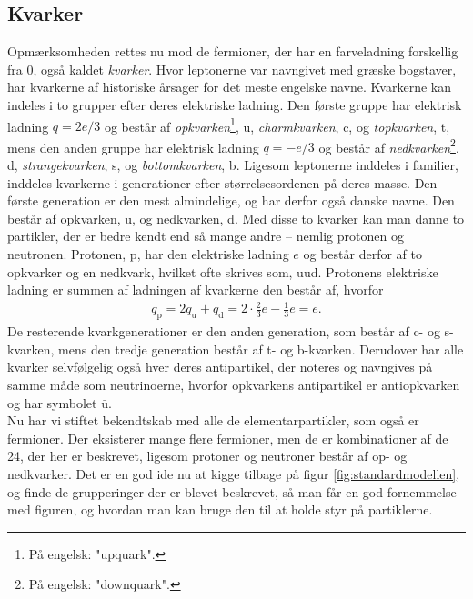 \subsection{Kvarker}
Opmærksomheden rettes nu mod de fermioner, der har en farveladning forskellig fra 0, også kaldet \emph{kvarker}. Hvor leptonerne var navngivet med græske bogstaver, har kvarkerne af historiske årsager for det meste engelske navne. Kvarkerne kan indeles i to grupper efter deres elektriske ladning. Den første gruppe har elektrisk ladning $q=2e/3$ og består af \emph{opkvarken}\footnote{På engelsk: "upquark".}, u, \emph{charmkvarken}, c, og \emph{topkvarken}, t, mens den anden gruppe har elektrisk ladning $q = -e/3$ og består af \emph{nedkvarken}\footnote{På engelsk: "downquark".}, d, \emph{strangekvarken}, s, og \emph{bottomkvarken}, b. Ligesom leptonerne inddeles i familier, inddeles kvarkerne i generationer efter størrelsesordenen på deres masse. Den første generation er den mest almindelige, og har derfor også danske navne. Den består af opkvarken, u, og nedkvarken, d. Med disse to kvarker kan man danne to partikler, der er bedre kendt end så mange andre -- nemlig protonen og neutronen. Protonen, p, har den elektriske ladning $e$ og består derfor af to opkvarker og en nedkvark, hvilket ofte skrives som, uud. Protonens elektriske ladning er summen af ladningen af kvarkerne den består af, hvorfor
%
\begin{align}
    q_\mathrm{p} = 2q_\mathrm{u} + q_\mathrm{d} = 2\cdot\frac{2}{3}e - \frac{1}{3}e = e.
\end{align}
%
De resterende kvarkgenerationer er den anden generation, som består af c- og s-kvarken, mens den tredje generation består af t- og b-kvarken. Derudover har alle kvarker selvfølgelig også hver deres antipartikel, der noteres og navngives på samme måde som neutrinoerne, hvorfor opkvarkens antipartikel er antiopkvarken og har symbolet $\bar{\mathrm u}$. \\

Nu har vi stiftet bekendtskab med alle de elementarpartikler, som også er fermioner. Der eksisterer mange flere fermioner, men de er kombinationer af de 24, der her er beskrevet, ligesom protoner og neutroner består af op- og nedkvarker. Det er en god ide nu at kigge tilbage på figur \ref{fig:standardmodellen}, og finde de grupperinger der er blevet beskrevet, så man får en god fornemmelse med figuren, og hvordan man kan bruge den til at holde styr på partiklerne.

